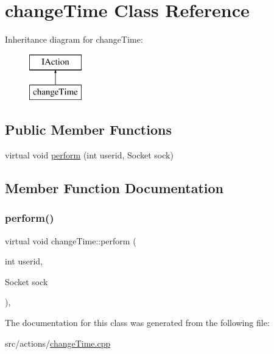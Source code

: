 \hypertarget{classchange_time}{}\section{change\+Time Class Reference}
\label{classchange_time}
Inheritance diagram for change\+Time\+:\begin{figure}[H]
\begin{center}
\leavevmode
\includegraphics[height=2.000000cm]{classchange_time}
\end{center}
\end{figure}
\subsection*{Public Member Functions}
\begin{DoxyCompactItemize}
\item 
virtual void \mbox{\hyperlink{classchange_time_ab9a68e5091a5d09cebd638c812fa5923}{perform}} (int userid, Socket sock)
\end{DoxyCompactItemize}


\subsection{Member Function Documentation}
\mbox{\label{classchange_time_ab9a68e5091a5d09cebd638c812fa5923}} 
\subsubsection{\texorpdfstring{perform()}{perform()}}
{\footnotesize\ttfamily virtual void change\+Time\+::perform (\begin{DoxyParamCaption}\item[{int}]{userid,  }\item[{Socket}]{sock }\end{DoxyParamCaption})\hspace{0.3cm}{\ttfamily [inline]}, {\ttfamily [virtual]}}



The documentation for this class was generated from the following file\+:\begin{DoxyCompactItemize}
\item 
src/actions/\mbox{\hyperlink{change_time_8cpp}{change\+Time.\+cpp}}\end{DoxyCompactItemize}
